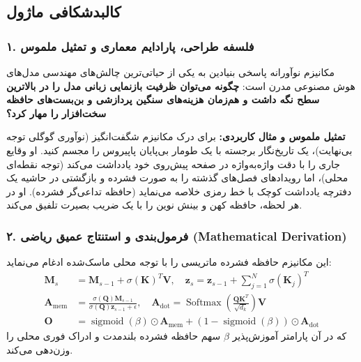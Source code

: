 \subsection{کالبدشکافی ماژول }

\subsubsection*{۱. فلسفه طراحی، پارادایم معماری و تمثیل ملموس}
مکانیزم نوآورانه  پاسخی بنیادین به یکی از حیاتی‌ترین چالش‌های مهندسی مدل‌های هوش مصنوعی مدرن است: \textbf{چگونه می‌توان ظرفیت بازنمایی زبانی مدل را در بالاترین سطح نگه داشت و هم‌زمان هزینه‌های سنگین پردازشی و بن‌بست‌های حافظه سخت‌افزار را مهار کرد؟}

\textbf{تمثیل ملموس و مثال کاربردی:}
برای درک مکانیزم شگفت‌انگیز  (نوآوری گوگلی توجه بی‌نهایت)، یک تاریخ‌نگار برجسته با یک طومار بی‌پایان پاپیروس را مجسم کنید. او وقایع جاری را با دقت واژه‌به‌واژه در صفحه پیش‌روی خود یادداشت می‌کند (توجه نقطه‌ای محلی)، اما رویدادهای فصل‌های گذشته را به صورت فشرده و بازگشتی در حاشیه یک دفترچه یادداشت کوچک با خط رمزی خلاصه می‌نماید (حافظه تداعی‌گر فشرده). او در هر لحظه، حافظه کهن و بینش نوین را با یک ضریب بصیرت تلفیق می‌کند.

\subsubsection*{۲. فرمول‌بندی و استنتاج عمیق ریاضی (Mathematical Derivation)}
این مکانیزم حافظه فشرده ماتریسی را با توجه محلی ماسک‌شده ادغام می‌نماید:
\begin{align}
\mathbf{M}_s &= \mathbf{M}_{s-1} + \sigma(\mathbf{K})^T \mathbf{V}, \quad \mathbf{z}_s = \mathbf{z}_{s-1} + \sum_{j=1}^N \sigma(\mathbf{K}_j)^T \\
\mathbf{A}_{\text{mem}} &= \frac{\sigma(\mathbf{Q}) \mathbf{M}_{s-1}}{\sigma(\mathbf{Q}) \mathbf{z}_{s-1} + \epsilon}, \quad \mathbf{A}_{\text{dot}} = \operatorname{Softmax}\left(\frac{\mathbf{Q} \mathbf{K}^T}{\sqrt{d_k}}\right) \mathbf{V} \\
\mathbf{O} &= \operatorname{sigmoid}(\beta) \odot \mathbf{A}_{\text{mem}} + (1 - \operatorname{sigmoid}(\beta)) \odot \mathbf{A}_{\text{dot}}
\end{align}
که در آن پارامتر آموزش‌پذیر $\beta$ سهم حافظه فشرده بلندمدت و ادراک فوری محلی را وزن‌دهی می‌کند.

